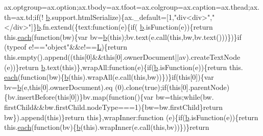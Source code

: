 \begin{DoxyCode}
      ax.optgroup=ax.option;ax.tbody=ax.tfoot=ax.colgroup=ax.caption=ax.thead;ax.th=ax.td;\textcolor{keywordflow}{if}(!
      \hyperlink{jquery_8js_aa4026ad5544b958e54ce5e106fa1c805}{b}.support.htmlSerialize)\{ax.\_default=[1,\textcolor{stringliteral}{"div<div>"},\textcolor{stringliteral}{"</div>"}]\}\hyperlink{jquery_8js_aa4026ad5544b958e54ce5e106fa1c805}{b}.fn.extend(\{text:\textcolor{keyword}{function}(e)\{\textcolor{keywordflow}{if}(
      \hyperlink{jquery_8js_aa4026ad5544b958e54ce5e106fa1c805}{b}.isFunction(e))\{\textcolor{keywordflow}{return} this.\hyperlink{jquery_8js_a871ff39db627c54c710a3e9909b8234c}{each}(\textcolor{keyword}{function}(bw)\{var bv=\hyperlink{jquery_8js_aa4026ad5544b958e54ce5e106fa1c805}{b}(\textcolor{keyword}{this});bv.text(e.call(\textcolor{keyword}{this},bw,bv.text()))\})\}\textcolor{keywordflow}{if}
      (typeof e!==\textcolor{stringliteral}{"object"}&&e!==\hyperlink{jquery_8js_a38ee4c0b5f4fe2a18d0c783af540d253}{L})\{\textcolor{keywordflow}{return} this.empty().append((\textcolor{keyword}{this}[0]&&\textcolor{keyword}{this}[0].ownerDocument||av).createTextNode
      (e))\}\textcolor{keywordflow}{return} \hyperlink{jquery_8js_aa4026ad5544b958e54ce5e106fa1c805}{b}.text(\textcolor{keyword}{this})\},wrapAll:\textcolor{keyword}{function}(e)\{\textcolor{keywordflow}{if}(\hyperlink{jquery_8js_aa4026ad5544b958e54ce5e106fa1c805}{b}.isFunction(e))\{\textcolor{keywordflow}{return} this.
      \hyperlink{jquery_8js_a871ff39db627c54c710a3e9909b8234c}{each}(\textcolor{keyword}{function}(bw)\{\hyperlink{jquery_8js_aa4026ad5544b958e54ce5e106fa1c805}{b}(\textcolor{keyword}{this}).wrapAll(e.call(\textcolor{keyword}{this},bw))\})\}\textcolor{keywordflow}{if}(\textcolor{keyword}{this}[0])\{var bv=\hyperlink{jquery_8js_aa4026ad5544b958e54ce5e106fa1c805}{b}(e,\textcolor{keyword}{this}[0].ownerDocument).eq
      (0).clone(\textcolor{keyword}{true});\textcolor{keywordflow}{if}(\textcolor{keyword}{this}[0].parentNode)\{bv.insertBefore(\textcolor{keyword}{this}[0])\}bv.map(\textcolor{keyword}{function}()\{var bw=\textcolor{keyword}{this};\textcolor{keywordflow}{while}(bw.
      firstChild&&bw.firstChild.nodeType===1)\{bw=bw.firstChild\}\textcolor{keywordflow}{return} bw\}).append(\textcolor{keyword}{this})\}\textcolor{keywordflow}{return} \textcolor{keyword}{this}\},wrapInner:\textcolor{keyword}{function}
      (e)\{\textcolor{keywordflow}{if}(\hyperlink{jquery_8js_aa4026ad5544b958e54ce5e106fa1c805}{b}.isFunction(e))\{\textcolor{keywordflow}{return} this.\hyperlink{jquery_8js_a871ff39db627c54c710a3e9909b8234c}{each}(\textcolor{keyword}{function}(bv)\{\hyperlink{jquery_8js_aa4026ad5544b958e54ce5e106fa1c805}{b}(\textcolor{keyword}{this}).wrapInner(e.call(\textcolor{keyword}{this},bv))\})\}\textcolor{keywordflow}{return} 

\end{DoxyCode}
